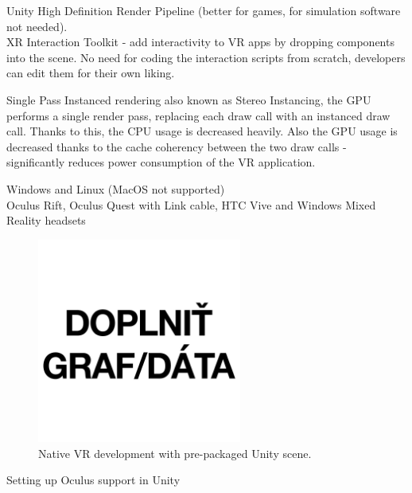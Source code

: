 Unity High Definition Render Pipeline (better for games, for simulation software not needed). \\

XR Interaction Toolkit - add interactivity to VR apps by dropping components into the scene. No need for coding the interaction scripts from scratch, developers can edit them for their own liking.

Single Pass Instanced rendering also known as Stereo Instancing, the GPU performs a single render pass, replacing each draw call with an instanced draw call. Thanks to this, the CPU usage is decreased heavily. Also the GPU usage is decreased thanks to the cache coherency between the two draw calls - significantly reduces power consumption of the VR application.

Windows and Linux (MacOS not supported) \\

Oculus Rift, Oculus Quest with Link cable, HTC Vive and Windows Mixed Reality headsets \\

\begin{figure}[!ht]
	\centering
	\includegraphics[width=0.6\textwidth]{figures/empty.jpg}
	\caption{Native VR development with pre-packaged Unity scene.}
	\label{fig:unity-native-vr-dev}
\end{figure}

Setting up Oculus support in Unity

